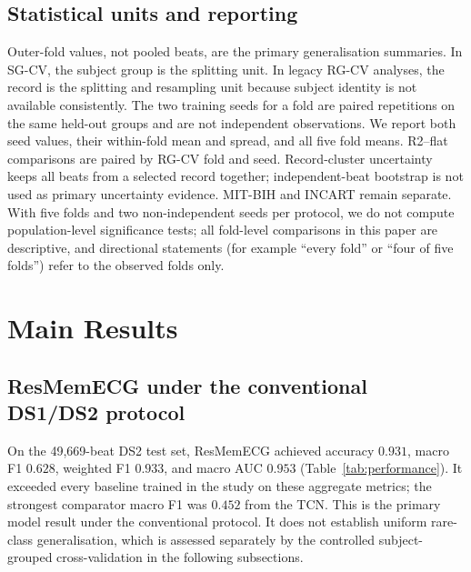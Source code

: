 \documentclass[pdflatex,sn-mathphys-num]{sn-jnl}
\begin{document}
\subsection{Statistical units and reporting}
Outer-fold values, not pooled beats, are the primary generalisation summaries.
In SG-CV, the subject group is the splitting unit. In legacy RG-CV analyses,
the record is the splitting and resampling unit because subject identity is not
available consistently. The two training seeds for a fold are paired repetitions
on the same held-out groups and are not independent observations. We report both
seed values, their within-fold mean and spread, and all five fold means. R2--flat
comparisons are paired by RG-CV fold and seed. Record-cluster uncertainty keeps
all beats from a selected record together; independent-beat bootstrap is not
used as primary uncertainty evidence. MIT-BIH and INCART remain separate. With
five folds and two non-independent seeds per protocol, we do not compute
population-level significance tests; all fold-level comparisons in this paper
are descriptive, and directional statements (for example ``every fold'' or
``four of five folds'') refer to the observed folds only.

\section{Main Results}
\subsection{ResMemECG under the conventional DS1/DS2 protocol}
On the 49,669-beat DS2 test set, ResMemECG achieved accuracy $0.931$, macro
F1 $0.628$, weighted F1 $0.933$, and macro AUC $0.953$
(Table~\ref{tab:performance}). It exceeded every baseline trained in the study
on these aggregate metrics; the strongest comparator macro F1 was $0.452$ from the
TCN. This is the primary model result under the conventional protocol. It does
not establish uniform rare-class generalisation, which is assessed separately
by the controlled subject-grouped cross-validation in the following subsections.
\end{document}
